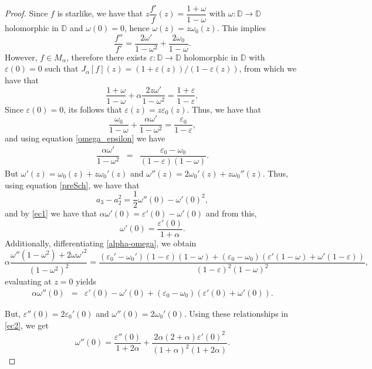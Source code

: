 \documentclass[reqno]{amsart}
\theoremstyle{plain}
\theoremstyle{definition}
\newcommand{\D}{\mathbb{D}}
\begin{document}
\begin{proof}Since $f$ is starlike, we have that $z\dfrac{f'}{f}(z)=\dfrac{1+\omega}{1-\omega}$ with $\omega:\D\to \D$ holomorphic in $\D$ and $\omega(0)=0$, hence $\omega(z)=z\omega_0(z)$. This implies
\begin{equation}\label{preSch}
\dfrac{f''}{f'}=\dfrac{2\omega'}{1-\omega^2}+\dfrac{2\omega_0}{1-\omega}.\end{equation}
However, $f \in M_\alpha$, therefore there exists $\varepsilon:\D\to \D$ holomorphic in $\D$ with $\varepsilon(0)=0$ such that $J_\alpha[f](z)=(1+\varepsilon(z))/(1-\varepsilon(z))$, from which we have that
\begin{equation}\label{omega_epsilon}
  \dfrac{1+\omega}{1-\omega}+\alpha \dfrac{2z\omega'}{1-\omega^2}=\dfrac{1+\varepsilon}{1-\varepsilon},
\end{equation}
Since $\varepsilon(0)=0$, its follows that $\varepsilon(z)=z\varepsilon_0(z)$. Thus, we have that
\begin{equation*} \frac{\omega_0}{1-\omega}+\frac{\alpha\omega'}{1-\omega^2}=\frac{\varepsilon_0}{1-\varepsilon},\end{equation*} and using equation \eqref{omega_epsilon} we have
\begin{eqnarray}\label{alpha-omega}
\dfrac{\alpha \omega'}{1-\omega^2} & = & \dfrac{\varepsilon_0-\omega_0}{(1-\varepsilon)(1-\omega)}.\label{ec1}
\end{eqnarray}
But $\omega'(z)=\omega_0(z)+z\omega_0'(z)$ and $\omega''(z)=2\omega_0'(z)+z\omega_0''(z)$. Thus, using equation \eqref{preSch}, we have that
$$a_3-a_2^2=\frac{1}{2}\omega''(0)-\omega'(0)^2,$$ and by \eqref{ec1} we have that $\alpha\omega'(0)=\varepsilon'(0)-\omega'(0)$ and from this,
$$\omega'(0)=\dfrac{\varepsilon'(0)}{1+\alpha}.$$
Additionally, differentiating \eqref{alpha-omega}, we obtain
$$\alpha\dfrac{\omega''(1-\omega^2)+2\omega\omega'^2}{(1-\omega^2)^2}=\dfrac{(\varepsilon_0'-\omega_0')(1-\varepsilon)(1-\omega)+(\varepsilon_0-\omega_0)\left(\varepsilon'(1-\omega)+\omega'(1-\varepsilon)\right)}{(1-\varepsilon)^2(1-\omega)^2},$$
evaluating at $z=0$ yields
\begin{eqnarray}
\alpha\omega''(0) & = & \varepsilon'(0)-\omega'(0)+(\varepsilon_0-\omega_0)(\varepsilon'(0)+\omega'(0)).\label{ec2}
\end{eqnarray}

But, $\varepsilon''(0)=2\varepsilon_0'(0)$ and $\omega''(0)=2\omega_0'(0)$. Using these relationships in \eqref{ec2}, we get
$$\omega''(0)=\dfrac{\varepsilon''(0)}{1+2\alpha}+\dfrac{2\alpha(2+\alpha)\varepsilon'(0)^2}{(1+\alpha)^2(1+2\alpha)}.$$


\end{proof}
\end{document}
